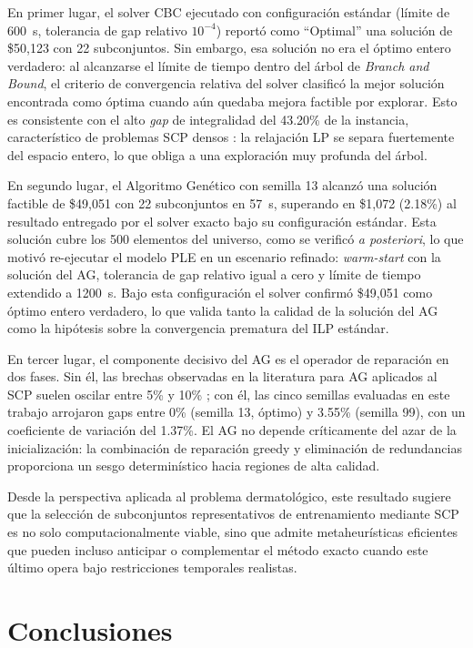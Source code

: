 \documentclass[conference]{IEEEtran}
\begin{document}
En primer lugar, el solver CBC ejecutado con configuración estándar (límite de 600~s, tolerancia de gap relativo $10^{-4}$) reportó como ``Optimal'' una solución de \$50,123 con 22 subconjuntos. Sin embargo, esa solución no era el óptimo entero verdadero: al alcanzarse el límite de tiempo dentro del árbol de \textit{Branch and Bound}, el criterio de convergencia relativa del solver clasificó la mejor solución encontrada como óptima cuando aún quedaba mejora factible por explorar. Esto es consistente con el alto \textit{gap} de integralidad del 43.20\% de la instancia, característico de problemas SCP densos \cite{caprara1999}: la relajación LP se separa fuertemente del espacio entero, lo que obliga a una exploración muy profunda del árbol.

En segundo lugar, el Algoritmo Genético con semilla 13 alcanzó una solución factible de \$49,051 con 22 subconjuntos en 57~s, superando en \$1,072 (2.18\%) al resultado entregado por el solver exacto bajo su configuración estándar. Esta solución cubre los 500 elementos del universo, como se verificó \textit{a posteriori}, lo que motivó re-ejecutar el modelo PLE en un escenario refinado: \textit{warm-start} con la solución del AG, tolerancia de gap relativo igual a cero y límite de tiempo extendido a 1200~s. Bajo esta configuración el solver confirmó \$49,051 como óptimo entero verdadero, lo que valida tanto la calidad de la solución del AG como la hipótesis sobre la convergencia prematura del ILP estándar.

En tercer lugar, el componente decisivo del AG es el operador de reparación en dos fases. Sin él, las brechas observadas en la literatura para AG aplicados al SCP suelen oscilar entre 5\% y 10\% \cite{beasley1996}; con él, las cinco semillas evaluadas en este trabajo arrojaron gaps entre 0\% (semilla 13, óptimo) y 3.55\% (semilla 99), con un coeficiente de variación del 1.37\%. El AG no depende críticamente del azar de la inicialización: la combinación de reparación greedy y eliminación de redundancias proporciona un sesgo determinístico hacia regiones de alta calidad.

Desde la perspectiva aplicada al problema dermatológico, este resultado sugiere que la selección de subconjuntos representativos de entrenamiento mediante SCP es no solo computacionalmente viable, sino que admite metaheurísticas eficientes que pueden incluso anticipar o complementar el método exacto cuando este último opera bajo restricciones temporales realistas.

\section{Conclusiones}
\end{document}
